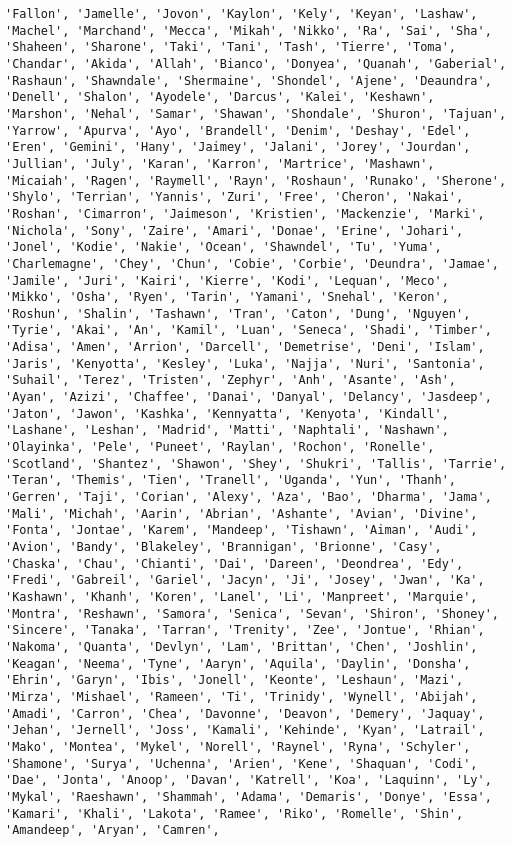 \documentclass[11pt]{article}
\begin{document}
\begin{Verbatim}[commandchars=\\\{\}]
'Fallon', 'Jamelle', 'Jovon', 'Kaylon', 'Kely', 'Keyan', 'Lashaw', 'Machel', 'Marchand', 'Mecca', 'Mikah', 'Nikko', 'Ra', 'Sai', 'Sha', 'Shaheen', 'Sharone', 'Taki', 'Tani', 'Tash', 'Tierre', 'Toma', 'Chandar', 'Akida', 'Allah', 'Bianco', 'Donyea', 'Quanah', 'Gaberial', 'Rashaun', 'Shawndale', 'Shermaine', 'Shondel', 'Ajene', 'Deaundra', 'Denell', 'Shalon', 'Ayodele', 'Darcus', 'Kalei', 'Keshawn', 'Marshon', 'Nehal', 'Samar', 'Shawan', 'Shondale', 'Shuron', 'Tajuan', 'Yarrow', 'Apurva', 'Ayo', 'Brandell', 'Denim', 'Deshay', 'Edel', 'Eren', 'Gemini', 'Hany', 'Jaimey', 'Jalani', 'Jorey', 'Jourdan', 'Jullian', 'July', 'Karan', 'Karron', 'Martrice', 'Mashawn', 'Micaiah', 'Ragen', 'Raymell', 'Rayn', 'Roshaun', 'Runako', 'Sherone', 'Shylo', 'Terrian', 'Yannis', 'Zuri', 'Free', 'Cheron', 'Nakai', 'Roshan', 'Cimarron', 'Jaimeson', 'Kristien', 'Mackenzie', 'Marki', 'Nichola', 'Sony', 'Zaire', 'Amari', 'Donae', 'Erine', 'Johari', 'Jonel', 'Kodie', 'Nakie', 'Ocean', 'Shawndel', 'Tu', 'Yuma', 'Charlemagne', 'Chey', 'Chun', 'Cobie', 'Corbie', 'Deundra', 'Jamae', 'Jamile', 'Juri', 'Kairi', 'Kierre', 'Kodi', 'Lequan', 'Meco', 'Mikko', 'Osha', 'Ryen', 'Tarin', 'Yamani', 'Snehal', 'Keron', 'Roshun', 'Shalin', 'Tashawn', 'Tran', 'Caton', 'Dung', 'Nguyen', 'Tyrie', 'Akai', 'An', 'Kamil', 'Luan', 'Seneca', 'Shadi', 'Timber', 'Adisa', 'Amen', 'Arrion', 'Darcell', 'Demetrise', 'Deni', 'Islam', 'Jaris', 'Kenyotta', 'Kesley', 'Luka', 'Najja', 'Nuri', 'Santonia', 'Suhail', 'Terez', 'Tristen', 'Zephyr', 'Anh', 'Asante', 'Ash', 'Ayan', 'Azizi', 'Chaffee', 'Danai', 'Danyal', 'Delancy', 'Jasdeep', 'Jaton', 'Jawon', 'Kashka', 'Kennyatta', 'Kenyota', 'Kindall', 'Lashane', 'Leshan', 'Madrid', 'Matti', 'Naphtali', 'Nashawn', 'Olayinka', 'Pele', 'Puneet', 'Raylan', 'Rochon', 'Ronelle', 'Scotland', 'Shantez', 'Shawon', 'Shey', 'Shukri', 'Tallis', 'Tarrie', 'Teran', 'Themis', 'Tien', 'Tranell', 'Uganda', 'Yun', 'Thanh', 'Gerren', 'Taji', 'Corian', 'Alexy', 'Aza', 'Bao', 'Dharma', 'Jama', 'Mali', 'Michah', 'Aarin', 'Abrian', 'Ashante', 'Avian', 'Divine', 'Fonta', 'Jontae', 'Karem', 'Mandeep', 'Tishawn', 'Aiman', 'Audi', 'Avion', 'Bandy', 'Blakeley', 'Brannigan', 'Brionne', 'Casy', 'Chaska', 'Chau', 'Chianti', 'Dai', 'Dareen', 'Deondrea', 'Edy', 'Fredi', 'Gabreil', 'Gariel', 'Jacyn', 'Ji', 'Josey', 'Jwan', 'Ka', 'Kashawn', 'Khanh', 'Koren', 'Lanel', 'Li', 'Manpreet', 'Marquie', 'Montra', 'Reshawn', 'Samora', 'Senica', 'Sevan', 'Shiron', 'Shoney', 'Sincere', 'Tanaka', 'Tarran', 'Trenity', 'Zee', 'Jontue', 'Rhian', 'Nakoma', 'Quanta', 'Devlyn', 'Lam', 'Brittan', 'Chen', 'Joshlin', 'Keagan', 'Neema', 'Tyne', 'Aaryn', 'Aquila', 'Daylin', 'Donsha', 'Ehrin', 'Garyn', 'Ibis', 'Jonell', 'Keonte', 'Leshaun', 'Mazi', 'Mirza', 'Mishael', 'Rameen', 'Ti', 'Trinidy', 'Wynell', 'Abijah', 'Amadi', 'Carron', 'Chea', 'Davonne', 'Deavon', 'Demery', 'Jaquay', 'Jehan', 'Jernell', 'Joss', 'Kamali', 'Kehinde', 'Kyan', 'Latrail', 'Mako', 'Montea', 'Mykel', 'Norell', 'Raynel', 'Ryna', 'Schyler', 'Shamone', 'Surya', 'Uchenna', 'Arien', 'Kene', 'Shaquan', 'Codi', 'Dae', 'Jonta', 'Anoop', 'Davan', 'Katrell', 'Koa', 'Laquinn', 'Ly', 'Mykal', 'Raeshawn', 'Shammah', 'Adama', 'Demaris', 'Donye', 'Essa', 'Kamari', 'Khali', 'Lakota', 'Ramee', 'Riko', 'Romelle', 'Shin', 'Amandeep', 'Aryan', 'Camren', 
\end{Verbatim}
\end{document}
